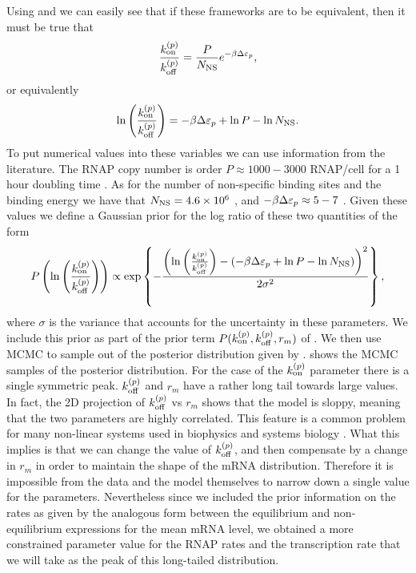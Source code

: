 Using  and  we can easily see that
if these frameworks are to be equivalent, then it must be true that
\begin{equation}
  {k^{(p)}_{\text{on}}\over k^{(p)}_{\text{off}}} = {P \over N_\text{NS}} e^{-\beta\Delta\varepsilon_p},
\end{equation}
or equivalently
\begin{equation}
  \ln \left({k^{(p)}_{\text{on}} \over k^{(p)}_{\text{off}}}\right) =
  -\beta\Delta\varepsilon_p + \ln P - \ln N_\text{NS}.
\end{equation}
To put numerical values into these variables we can use information from the
literature. The RNAP copy number is order $P \approx 1000-3000$ RNAP/cell for a
1 hour doubling time \cite{Klumpp2008}.
As for the number of non-specific
binding sites and the binding energy we have that $N_\text{NS} = 4.6\times 10^6$
\cite{Bintu2005a}, and $-\beta\Delta\varepsilon_p \approx 5 - 7$
\cite{Brewster2012}. Given these values we define a Gaussian prior for the log
ratio of these two quantities of the form
\begin{equation}
  P\left(\ln \left({k^{(p)}_{\text{on}} \over k^{(p)}_{\text{off}}}\right) \right) \propto
  \exp \left\{ - {\left(\ln \left({k^{(p)}_{\text{on}} \over k^{(p)}_{\text{off}}}\right) -
  \left(-\beta\Delta\varepsilon_p + \ln P - \ln N_\text{NS} \right) \right)^2
  \over 2 \sigma^2} \right\},
  \label{seq_prior_single}
\end{equation}
where $\sigma$ is the variance that accounts for the uncertainty in these
parameters. We include this prior as part of the prior term $P(k^{(p)}_{\text{on}}, k^{(p)}_{\text{off}},
r_m)$ of . We then use MCMC to sample out of the
posterior distribution given by . 
shows the MCMC samples of the posterior distribution. For the case of the
$k^{(p)}_{\text{on}}$ parameter there is a single symmetric peak. $k^{(p)}_{\text{off}}$ and $r_m$ have a
rather long tail towards large values. In fact, the 2D projection of $k^{(p)}_{\text{off}}$ vs
$r_m$ shows that the model is sloppy, meaning that the two parameters are highly
correlated. This feature is a common problem for many non-linear systems used in
biophysics and systems biology \cite{Transtrum2015}. What this implies is that
we can change the value of $k^{(p)}_{\text{off}}$, and then compensate by a change in $r_m$ in
order to maintain the shape of the mRNA distribution. Therefore it is impossible
from the data and the model themselves to narrow down a single value for the
parameters. Nevertheless since we included the prior information on the rates as
given by the analogous form between the equilibrium and non-equilibrium
expressions for the mean mRNA level, we obtained a more constrained parameter
value for the RNAP rates and the transcription rate that we will take as the
peak of this long-tailed distribution.

